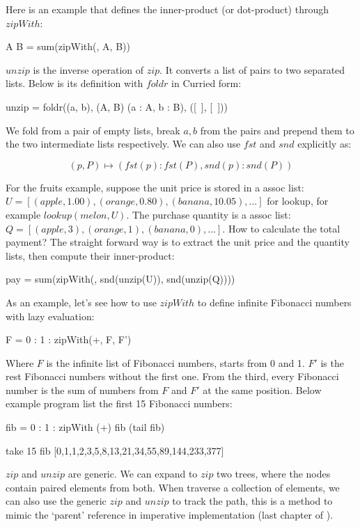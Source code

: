 \documentclass[b5paper]{article}
\begin{document}
Here is an example that defines the inner-product (or dot-product)\cite{wiki-dot-product} through $zipWith$:

\be
A \cdot B = sum(zipWith(\cdot, A, B))
\ee

$unzip$ is the inverse operation of $zip$. It converts a list of pairs to two separated lists. Below is its definition with $foldr$ in Curried form:

\be
unzip = foldr((a, b), (A, B) \mapsto (a : A, b : B), ([\ ], [\ ]))
\ee

We fold from a pair of empty lists, break $a, b$ from the pairs and prepend them to the two intermediate lists respectively. We can also use $fst$ and $snd$ explicitly as:

\[
(p, P) \mapsto (fst(p) : fst(P), snd(p) : snd(P))
\]

For the fruits example, suppose the unit price is stored in a assoc list: $U = [(apple, 1.00), (orange, 0.80), (banana, 10.05), ...]$ for lookup, for example $lookup(melon, U)$. The purchase quantity is a assoc list: $Q = [(apple, 3), (orange, 1), (banana, 0), ...]$. How to calculate the total payment? The straight forward way is to extract the unit price and the quantity lists, then compute their inner-product:

\be
pay = sum(zipWith(\cdot, snd(unzip(U)), snd(unzip(Q))))
\ee

As an example, let's see how to use $zipWith$ to define infinite Fibonacci numbers with lazy evaluation:

\be
F = 0 : 1 : zipWith(+, F, F')
\ee

Where $F$ is the infinite list of Fibonacci numbers, starts from 0 and 1. $F'$ is the rest Fibonacci numbers without the first one. From the third, every Fibonacci number is the sum of numbers from $F$ and $F'$ at the same position. Below example program list the first 15 Fibonacci numbers:

\begin{Haskell}
fib = 0 : 1 : zipWith (+) fib (tail fib)

take 15 fib
[0,1,1,2,3,5,8,13,21,34,55,89,144,233,377]
\end{Haskell}

$zip$ and $unzip$ are generic. We can expand to $zip$ two trees, where the nodes contain paired elements from both. When traverse a collection of elements, we can also use the generic $zip$ and $unzip$ to track the path, this is a method to mimic the `parent' reference in imperative implementation (last chapter of \cite{learn-haskell}).
\end{document}
